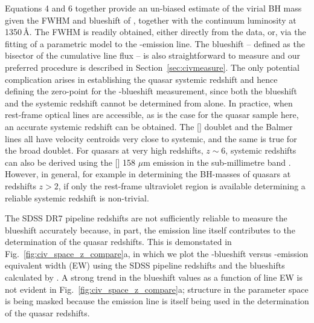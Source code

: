 Equations 4 and 6 together provide an un-biased estimate of the virial BH mass given the FWHM and blueshift of , together with the continuum luminosity at 1350\,\AA. 
The FWHM is readily obtained, either directly from the data, or, via the fitting of a parametric model to the -emission line. 
The blueshift -- defined as the bisector of the cumulative line flux -- is also straightforward to measure and our preferred procedure is described in Section~\ref{sec:civmeasure}.
The only potential complication arises in establishing the quasar systemic redshift and hence defining the zero-point for the -blueshift measurement, since both the blueshift and the systemic redshift cannot be determined from  alone. 
In practice, when rest-frame optical lines are accessible, as is the case for the quasar sample here, an accurate systemic redshift can be obtained. 
The [] doublet and the Balmer lines all have velocity centroids very close to systemic, and the same is true for the broad  doublet. 
For quasars at very high redshifts, $z\sim6$, systemic redshifts can also be derived using the [] 158 $\mu$m emission in the sub-millimetre band \citep[e.g.][]{venemans16}. 
However, in general, for example in determining the BH-masses of quasars at redshifts $z>2$, if only the rest-frame ultraviolet region is available determining a reliable systemic redshift is non-trivial. 

The SDSS DR7 pipeline redshifts are not sufficiently reliable to measure the  blueshift accurately because, in part, the  emission line itself contributes to the determination of the quasar redshifts. 
This is demonstated in Fig.~\ref{fig:civ_space_z_compare}a, in which we plot the -blueshift versus -emission equivalent width (EW) using the SDSS pipeline redshifts and the blueshifts calculated by \citet{shen11}.  
A strong trend in the blueshift values as a function of line EW is not evident in Fig.~\ref{fig:civ_space_z_compare}a; structure in the parameter space is being masked because the  emission line is itself being used in the determination of the quasar redshifts. 

